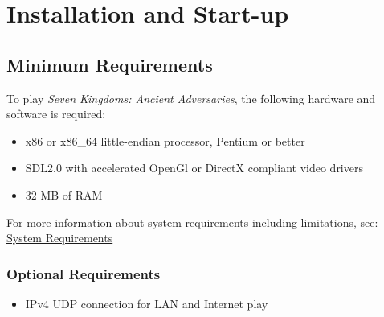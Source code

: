 
\chapter{Installation and Start-up}

\section{Minimum Requirements}

To play \textit{Seven Kingdoms: Ancient Adversaries}, the following hardware and software is required:

\begin{itemize}
\item x86 or x86\_64 little-endian processor, Pentium or better
\item SDL2.0 with accelerated OpenGl or DirectX compliant video drivers
\item 32 MB of RAM
\end{itemize}

For more information about system requirements including limitations, see: \\

\href{https://www.7kfans.com/wiki/index.php/System_Requirements_for_Seven_Kingdoms_1}{System Requirements}

\subsection{Optional Requirements}

\begin{itemize}
\item IPv4 UDP connection for LAN and Internet play
\end{itemize}

